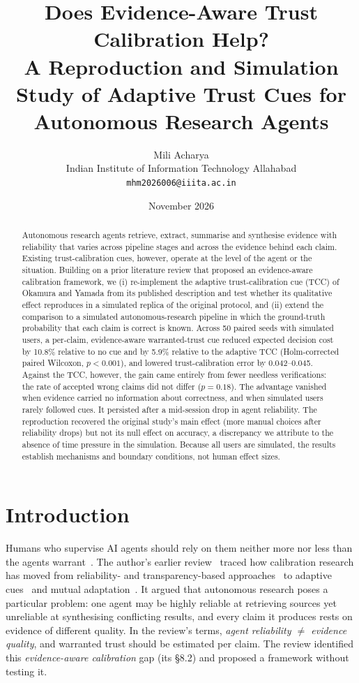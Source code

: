 \documentclass[10pt]{article}
\title{Does Evidence-Aware Trust Calibration Help?\\
\large A Reproduction and Simulation Study of Adaptive Trust Cues for Autonomous Research Agents}
\author{Mili Acharya\\ Indian Institute of Information Technology Allahabad\\ \texttt{mhm2026006@iiita.ac.in}}
\date{November 2026}
\begin{document}
\maketitle

\begin{abstract}
Autonomous research agents retrieve, extract, summarise and synthesise evidence with reliability that varies across pipeline stages and across the evidence behind each claim. Existing trust-calibration cues, however, operate at the level of the agent or the situation. Building on a prior literature review that proposed an evidence-aware calibration framework, we (i) re-implement the adaptive trust-calibration cue (TCC) of Okamura and Yamada from its published description and test whether its qualitative effect reproduces in a simulated replica of the original protocol, and (ii) extend the comparison to a simulated autonomous-research pipeline in which the ground-truth probability that each claim is correct is known. Across 50 paired seeds with simulated users, a per-claim, evidence-aware warranted-trust cue reduced expected decision cost by 10.8\% relative to no cue and by 5.9\% relative to the adaptive TCC (Holm-corrected paired Wilcoxon, $p<0.001$), and lowered trust-calibration error by 0.042--0.045. Against the TCC, however, the gain came entirely from fewer needless verifications: the rate of accepted wrong claims did not differ ($p=0.18$). The advantage vanished when evidence carried no information about correctness, and when simulated users rarely followed cues. It persisted after a mid-session drop in agent reliability. The reproduction recovered the original study's main effect (more manual choices after reliability drops) but not its null effect on accuracy, a discrepancy we attribute to the absence of time pressure in the simulation. Because all users are simulated, the results establish mechanisms and boundary conditions, not human effect sizes.
\end{abstract}

\section{Introduction}
Humans who supervise AI agents should rely on them neither more nor less than the agents warrant~\cite{mehrotra2024systematic,wischnewski2023measuring}. The author's earlier review~\cite{acharya2026review} traced how calibration research has moved from reliability- and transparency-based approaches~\cite{chen2018situation,akash2020human} to adaptive cues~\cite{okamura2020adaptive,okamura2020empirical} and mutual adaptation~\cite{devisser2020longitudinal}. It argued that autonomous research poses a particular problem: one agent may be highly reliable at retrieving sources yet unreliable at synthesising conflicting results, and every claim it produces rests on evidence of different quality. In the review's terms, \emph{agent reliability $\neq$ evidence quality}, and warranted trust should be estimated per claim. The review identified this \emph{evidence-aware calibration} gap (its \S8.2) and proposed a framework without testing it.
\end{document}
